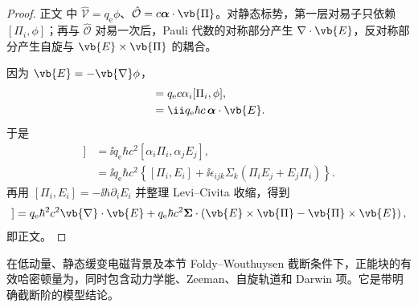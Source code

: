 \begin{proof}
正文 中 $\hat{\mathcal V}=q_{\mathrm e}\phi$、$\hat{\mathcal O}=c\boldsymbol\alpha\cdot\vb{\Pi}$。对静态标势，第一层对易子只依赖 $[\Pi_i,\phi]$；再与 $\hat{\mathcal O}$ 对易一次后，Pauli 代数的对称部分产生 $\nabla\cdot\vb{E}$，反对称部分产生自旋与 $\vb{E}\times\vb{\Pi}$ 的耦合。

因为 $\vb{E}=-\vb{\nabla}\phi$，
\begin{align*}
 [\hat{\mathcal O},\hat{\mathcal V}]
 &=q_{\mathrm e} c\alpha_i[\Pi_i,\phi],\\
 &=\ii q_{\mathrm e}\hbar c\,\boldsymbol\alpha\cdot\vb{E}.
\end{align*}
于是
\begin{align*}
 [\hat{\mathcal O},[\hat{\mathcal O},\hat{\mathcal V}]]
 &=\ii q_{\mathrm e}\hbar c^2[\alpha_i\Pi_i,\alpha_jE_j],\\
 &=\ii q_{\mathrm e}\hbar c^2
 \left
 \{[\Pi_i,E_i]
 +\ii\epsilon_{ijk}\Sigma_k(\Pi_iE_j+E_j\Pi_i)
 \right\}.
\end{align*}
再用 $[\Pi_i,E_i]=-\ii\hbar\partial_iE_i$ 并整理 Levi--Civita 收缩，得到
\begin{equation*}
 [\hat{\mathcal O},[\hat{\mathcal O},\hat{\mathcal V}]]
 =q_{\mathrm e}\hbar^2c^2\vb{\nabla}\cdot\vb{E}
 +q_{\mathrm e}\hbar c^2\boldsymbol\Sigma\cdot
 \left(\vb{E}\times\vb{\Pi}-\vb{\Pi}\times\vb{E}\right),
\end{equation*}
即正文。
\end{proof}

\begin{proposition}
在低动量、静态缓变电磁背景及本节 Foldy--Wouthuysen 截断条件下，正能块的有效哈密顿量为，同时包含动力学能、Zeeman、自旋轨道和 Darwin 项。它是带明确截断阶的模型结论。
\end{proposition}

